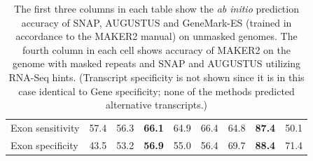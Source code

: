 \documentclass[a4paper,10pt]{report}
\begin{document}
\begin{table}
\begin{center}
\begin{scriptsize}
\begin{tabular}{|l|cccc|cccc|}
Exon sensitivity       & 57.4 & 56.3 & \textbf{66.1} & 64.9 & 66.4 & 64.8 & \textbf{87.4} & 50.1\\
Exon specificity       & 43.5 & 53.2 & \textbf{56.9} & 55.0 & 56.4 & 69.7 & \textbf{88.4} & 71.4\\
\hline
 \end{tabular}
\end{scriptsize}
\end{center}
\caption{The first three columns in each table show the \textit{ab initio} prediction accuracy of SNAP, AUGUSTUS and GeneMark-ES (trained in accordance to the MAKER2 manual) on unmasked genomes. The fourth column in each cell shows accuracy of MAKER2 on the genome with masked repeats and SNAP and AUGUSTUS utilizing RNA-Seq hints. (Transcript specificity is not shown since it is in this case identical to Gene specificity; none of the methods predicted alternative transcripts.) \label{single_preds_maker}}
\end{table}

% 
\end{document}
